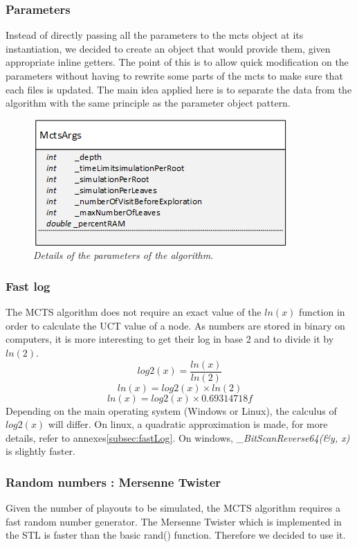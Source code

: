 \subsubsection{Parameters}
Instead of directly passing all the parameters to the mcts object at its instantiation, we decided to create an object that would provide them, given appropriate inline getters. The point of this is to allow quick modification on the parameters without having to rewrite some parts of the mcts to make sure that each files is updated. The main idea applied here is to separate the data from the algorithm with the same principle as the parameter object pattern.
\begin{figure}[H] 
\centerline{\includegraphics[scale=0.8]{Data_Structure/Img/MctsArgs.png}}
\caption{\label{fig:mctsargsuml}\textit{Details of the parameters of the algorithm}.}
\end{figure}

\subsubsection{Fast log}
The MCTS algorithm does not require an exact value of the \ensuremath{ln(x)} function in order to calculate the UCT value of a node. As numbers are stored in binary on computers, it is more interesting to get their log in base 2 and to divide it by \ensuremath{ln(2)}. 
\begin{equation}
log2(x) = \frac{ln(x)}{ln(2)}
\end{equation}
\begin{equation}
ln(x) = log2(x) \times ln(2)
\end{equation}
\begin{equation}
ln(x) = log2(x) \times 0.69314718f
\end{equation}
Depending on the main operating system (Windows or Linux), the calculus of \ensuremath{log2(x)} will differ. On linux, a quadratic approximation is made, for more details, refer to annexes\ref{subsec:fastLog}. On windows, \textit{\_BitScanReverse64(\&y, x)} is slightly faster. 

\subsubsection{Random numbers : Mersenne Twister}
Given the number of playouts to be simulated, the MCTS algorithm requires a fast random number generator. The Mersenne Twister which is implemented in the STL is faster than the basic rand() function. Therefore we decided to use it.


